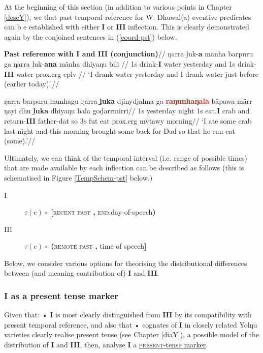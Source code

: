 \documentclass[11pt,dvipsnames]{report}
\begin{document}
At the beginning of this section (in addition to various points in Chapter \ref{descY}), we that past temporal reference for W. Dhuwal(a) eventive predicates can b e established with either \textbf{I} or \textbf{III} inflection. This is clearly demonstrated again by the conjoined sentences in (\ref{coord-pst}) below.

\pex\glpreamble \textbf{Past reference with I and III (conjunction)}\label{coord-pst}//
\a\begingl\gla \nogloss{[} ŋarra ḻuk-\textbf{a} mänha barpuru \nogloss{]} ga \nogloss{[} ŋarra ḻuk-\textbf{ana} mänha dhiyaŋu bili \nogloss{]}//
\glb 1s drink-\textbf{I} water yesterday and 1s drink-\textbf{III} water \gls{prox}.\gls{erg} \gls{cplv} //
\glft`I drank water yesterday and I drank water just before (earlier today).'\trailingcitation{[BM~20190405]}//\endgl


\a\begingl\gla ŋarra barpuru munhagu ŋarra \textbf{ḻuka} djinydjalma ga \textcolor{red}{\textbf{raŋunhaŋala}} bäpawa märr ŋayi dhu \textbf{ḻuka} dhiyaŋu bala goḏarrmirri//
\glb 1s yesterday night 1s eat.\textbf{I} crab and return-\textbf{III} father-\gls{dat} so 3s \gls{fut} eat \gls{prox}.\gls{erg} \gls{mvtawy} morning//
 \glft`I ate some crab last night and this morning brought some back for Dad so that he can eat (some).'\trailingcitation{[BM~20190416]}//\endgl

\xe




Ultimately, we can think of the temporal interval (i.e. range of possible times) that are made available by each inflection can be described as follows (this is schematised in Figure \ref{TempSchem-pst} below.) 
\begin{description}
	\item[\phantom{I}I\phantom{I}]$ \tau(e) \circ$ \textbf{[}\textsc{recent past} \textbf{,} \textsc{end}.day-of-speech\textbf{)}
	\item[III]$ \tau(e) \circ$ \textbf{(}\textsc{remote past} \textbf{,} time-of speech\textbf{]} 
\end{description}

Below, we consider various options for theorising the distributional differences between (and meaning contribution of) \textbf{I} and \textbf{III}.
\subsubsection{\textbf{I} as a present tense marker}


Given that: • \textbf{I} is most clearly distinguished from \textbf{III} by its compatibility with present temporal reference, and also that • cognates of \textbf{I} in closely related Yolŋu varieties clearly realise present tense (see Chapter \ref{diaY}), a possible model of the distribution of \textbf{I} and \textbf{III}, then, analyse \textbf{I} a \ul{\textsc{present-}tense marker}.
\end{document}
